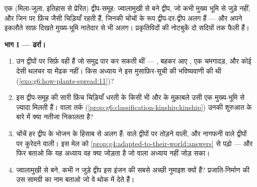 \begin{problem}[{सप्ताहांत समस्या --- किसी ज्वालामुखी द्वीप-समूह पर दो
सदियाँ}]\label{pb:g9:how-species-change:1}
एक (मिला-जुला, इतिहास से प्रेरित) द्वीप-समूह: ज्वालामुखी से बने द्वीप,
जो कभी मुख्य भूमि से जुड़े नहीं, और जिन पर फ़िंच जैसी चिड़ियाँ रहती हैं,
जिनकी चोंचों के रूप द्वीप-दर-द्वीप अलग हैं --- और अपने इकलौते साफ़ दिखते
मुख्य-भूमि नातेदार से भी अलग। प्रकृतिविदों की नोटबुकें दो सदियों तक फैली
हैं।

\medskip\noindent\textbf{भाग I --- ढर्रा।}
\begin{enumerate}
  \item उन द्वीपों पर सिर्फ़ वही  हैं जो समुद्र पार कर सकती
        थीं --- , बहकर आए , एक चमगादड़, और कोई देसी थलचर
         या मेंढक नहीं। किस अध्याय ने इस मुसाफ़िर-सूची की
        भविष्यवाणी की थी (\cref{exo:g6:how-plants-spread:11})?
  \item इस द्वीप-समूह की सारी फ़िंच चिड़ियाँ धरती के किसी भी और 
        के मुक़ाबले उसी एक मुख्य-भूमि  से ज़्यादा मिलती हैं।
         वाला तर्क
        (\cref{prop:g6:classification-kinship:kinship}) उनकी शुरुआत के
        बारे में क्या नतीजा निकालता है?
  \item चोंचें हर द्वीप के भोजन के हिसाब से अलग हैं:  वाले द्वीपों
        पर  तोड़ने वाली, और नागफनी वाले द्वीपों पर कुरेदने वाली। इस
        मेल को \cref{prop:g4:adapted-to-their-world:answers} से पढ़ो
        --- और फिर बताओ कि यह अध्याय वह क्या जोड़ता है जो  वाला
        अध्याय नहीं जोड़ सका।
  \item ज्वालामुखी से बने, कभी न जुड़े द्वीप इस इंजन की सबसे अच्छी
        नुमाइश क्यों हैं? प्रजाति-निर्माण की उस सामग्री का नाम बताओ जो
        वे थोक में देते हैं।
\end{enumerate}


\end{problem}
